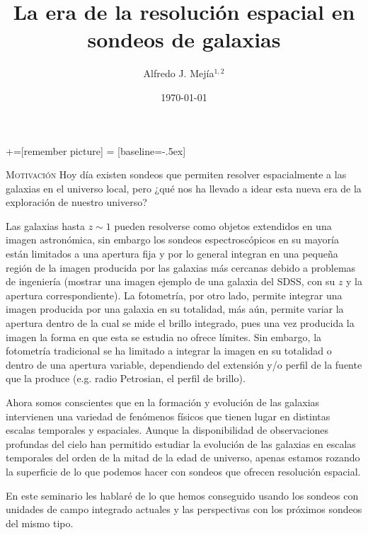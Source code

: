 \documentclass[xcolor=dvipsnames,4pt,hyperref={colorlinks,citecolor=black,linkcolor=black,urlcolor=black}]{beamer}
\begin{document}
+=[remember picture]
 = [baseline=-.5ex]

\begin{frame}
\title{La era de la resolución espacial en sondeos de galaxias}
\author{Alfredo J. Mej\'ia$^{1,2}$}

\date{\today}


\maketitle
\end{frame}

\begin{frame}[allowframebreaks]{\textsc{Motivación}}
%
Hoy día existen sondeos que permiten resolver espacialmente a las galaxias en el universo local,
pero ¿qué nos ha llevado a idear esta nueva era de la exploración de nuestro universo?

Las galaxias hasta $z\sim1$ pueden resolverse como objetos extendidos en una imagen astronómica, sin
embargo los sondeos espectroscópicos en su mayoría están limitados a una apertura fija y por lo
general integran en una pequeña región de la imagen producida por las galaxias más cercanas debido a
problemas de ingeniería (mostrar una imagen ejemplo de una galaxia del SDSS, con su $z$ y la
apertura correspondiente). La fotometría, por otro lado, permite integrar una imagen producida por
una galaxia en su totalidad, más aún, permite variar la apertura dentro de la cual se mide el brillo
integrado, pues una vez producida la imagen la forma en que esta se estudia no ofrece límites. Sin
embargo, la fotometría tradicional se ha limitado a integrar la imagen en su totalidad o dentro de
una apertura variable, dependiendo del extensión y/o perfil de la fuente que la produce (e.g. radio
Petrosian, el perfil de brillo).

Ahora somos conscientes que en la formación y evolución de las galaxias intervienen una variedad de
fenómenos físicos que tienen lugar en distintas escalas temporales y espaciales. Aunque la
disponibilidad de observaciones profundas del cielo han permitido estudiar la evolución de las
galaxias en escalas temporales del orden de la mitad de la edad de universo, apenas estamos rozando
la superficie de lo que podemos hacer con sondeos que ofrecen resolución espacial.

En este seminario les hablaré de lo que hemos conseguido usando los sondeos con unidades de campo
integrado actuales y las perspectivas con los próximos sondeos del mismo tipo.
%
\end{frame}
\end{document}

